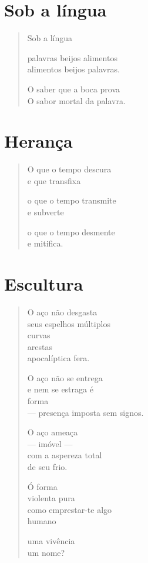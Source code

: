 \chapter{Sob a língua}

\begin{verse}
Sob a língua

palavras beijos alimentos\\
alimentos beijos palavras.

O saber que a boca prova\\
O sabor mortal da palavra.
\end{verse}

\chapter{Herança}

\begin{verse}
O que o tempo descura\\
e que transfixa

o que o tempo transmite\\
e subverte

o que o tempo desmente\\
e mitifica.
\end{verse}

\chapter{Escultura}

\begin{verse}
O aço não desgasta\\
seus espelhos múltiplos\\
curvas\\
arestas\\
apocalíptica fera.

O aço não se entrega\\
e nem se estraga é\\
\hfill{}forma\\
--- presença imposta sem signos.

O aço ameaça\\
--- imóvel ---\\
com a aspereza total\\
de seu frio.

Ó forma\\
violenta pura\\
como emprestar-te algo\\
\hfill{}humano

uma vivência\\
um nome?
\end{verse}

